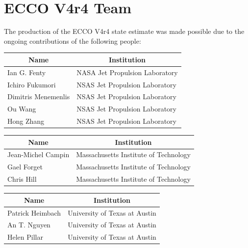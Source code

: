 \pagebreak
\section{ECCO V4r4 Team}
The production of the ECCO V4r4 state estimate was made possible due to the ongoing contributions of the following people:

\vspace{.5cm}

\vspace{.25cm}
\begin{center}
\begin{tabular}{ m{} m{}}
    \multicolumn{1}{c}{\textbf{Name}} & \multicolumn{1}{c}{\textbf{Institution}} \\ \hline
    Ian G. Fenty & NASA Jet Propulsion Laboratory\\ \hline
    Ichiro Fukumori & NSAS Jet Propulsion Laboratory \\ \hline
    Dimitris Menemenlis & NSAS Jet Propulsion Laboratory\\ \hline
    Ou Wang & NSAS Jet Propulsion Laboratory \\ \hline
    Hong Zhang & NSAS Jet Propulsion Laboratory\\ \hline
\end{tabular}
\end{center}

\vspace{.25cm}

\vspace{.25cm}
\begin{center}
\begin{tabular}{m{} m{} }
    \multicolumn{1}{c}{\textbf{Name}} & \multicolumn{1}{c}{\textbf{Institution}} \\ \hline
    Jean-Michel Campin & Massachusetts Institute of Technology \\ \hline
    Gael Forget & Massachusetts Institute of Technology \\ \hline
    Chris Hill & Massachusetts Institute of Technology \\ \hline
\end{tabular}
\end{center}

\vspace{.25cm}

\vspace{.25cm}
\begin{center}
\begin{tabular}{m{} m{} }
    \multicolumn{1}{c}{\textbf{Name}} & \multicolumn{1}{c}{\textbf{Institution}} \\ \hline
    Patrick Heimbach & University of Texas at Austin \\ \hline
    An T. Nguyen & University of Texas at Austin \\ \hline
    Helen Pillar & University of Texas at Austin \\ \hline
\end{tabular}
\end{center}

